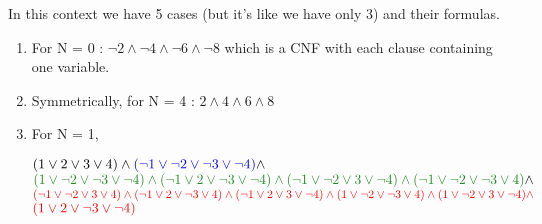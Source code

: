 \documentclass[a4paper]{article}
\begin{document}
\begin{enumerate}
In this context we have 5 cases (but it’s like we have only 3) and their formulas.
\begin{enumerate}
\item For N = 0 :  \quad $ \neg2 \land \neg4 \land \neg6 \land \neg8 $ 
 which is a CNF with each clause containing one variable.
\newline
\item Symmetrically, for N = 4 : \quad $ 2 \land 4 \land 6 \land 8 $
\item For N = 1, \newline
\begin{center}
$ ( 1 \lor 2 \lor 3 \lor 4) \land \textcolor{blue}{( \neg 1 \lor \neg 2 \lor \neg 3 \lor \neg 4)}  \land $ \newline
$\textcolor{ForestGreen}{( 1 \lor \neg 2 \lor \neg 3 \lor \neg 4 ) \land  ( \neg 1 \lor 2 \lor \neg 3 \lor \neg 4 ) \land ( \neg 1 \lor \neg 2 \lor 3 \lor \neg 4 ) \land ( \neg 1 \lor \neg 2 \lor \neg 3 \lor 4 )} \land $ \newline
$\textcolor{red}{( \neg 1 \lor \neg 2 \lor 3 \lor 4) \land ( \neg 1 \lor 2 \lor \neg 3 \lor 4 ) \land ( \neg 1 \lor 2 \lor 3 \lor \neg 4 ) \land ( 1 \lor \neg 2 \lor \neg 3 \lor 4 ) \land ( 1 \lor \neg 2 \lor 3 \lor \neg 4 ) \land} $ \newline $\textcolor{red}{ ( 1 \lor 2 \lor \neg 3 \lor \neg 4 )} $
\end{center}


\end{enumerate}
\end{enumerate}
\end{document}
